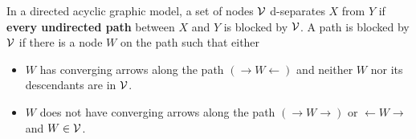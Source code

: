 \begin{refsection}
\begin{definition}[d-separation]\cite[324]{murphy2012machine}
In a directed acyclic graphic model, a set of nodes	
$\mathcal{V}$ d-separates $X$ from $Y$ if \textbf{every undirected path} between $X$ and $Y$ is blocked by $\mathcal{V}$. A path is blocked by $\mathcal{V}$ if there is a node $W$ on the path such that either
\begin{itemize}
	\item $W$ has converging arrows along the path $(\rightarrow W \leftarrow)$ and neither $W$ nor its descendants are in $\mathcal{V}$.
	\item $W$ does not have converging arrows along the path $(\rightarrow W \rightarrow)$ or $\leftarrow W \rightarrow$ and $W\in \mathcal{V}$.
\end{itemize}	
\end{definition}



\end{refsection}
